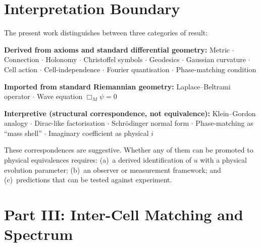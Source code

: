 \documentclass[12pt]{amsart}
\begin{document}
\section{Interpretation Boundary}

The present work distinguishes between three categories of result:

\textbf{Derived from axioms and standard differential geometry:}
Metric $\cdot$ Connection $\cdot$ Holonomy $\cdot$ Christoffel symbols $\cdot$ Geodesics
$\cdot$ Gaussian curvature $\cdot$ Cell action $\cdot$ Cell-independence $\cdot$ Fourier
quantisation $\cdot$ Phase-matching condition

\textbf{Imported from standard Riemannian geometry:}
Laplace--Beltrami operator $\cdot$ Wave equation $\Box_M \psi = 0$

\textbf{Interpretive (structural correspondence, not equivalence):}
Klein--Gordon analogy $\cdot$ Dirac-like factorisation $\cdot$ Schr\"odinger normal form
$\cdot$ Phase-matching as ``mass shell'' $\cdot$ Imaginary coefficient as physical $i$

These correspondences are suggestive. Whether any of them can be promoted to physical
equivalences requires: (a)~a derived identification of $u$ with a physical evolution parameter;
(b)~an observer or measurement framework; and (c)~predictions that can be tested against
experiment.


\section*{Part III: Inter-Cell Matching and Spectrum}
\end{document}
